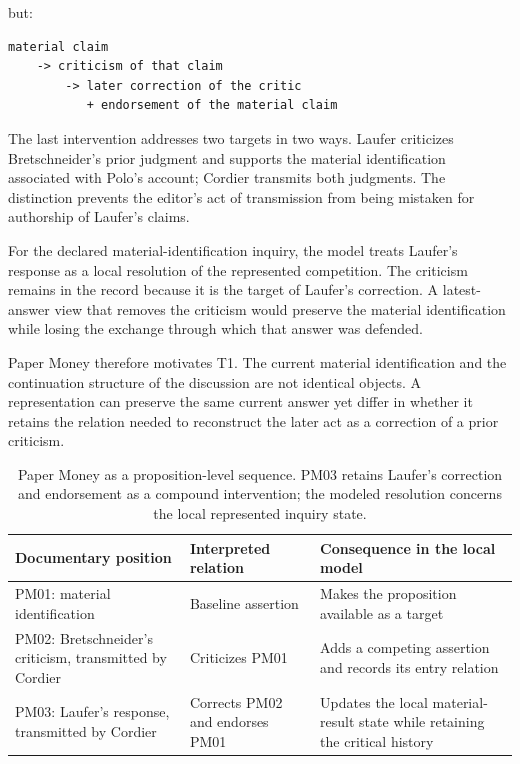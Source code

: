 \documentclass[11pt,a4paper]{article}
\begin{document}
but:


\begin{verbatim}
material claim
    -> criticism of that claim
        -> later correction of the critic
           + endorsement of the material claim
\end{verbatim}

The last intervention addresses two targets in two ways. Laufer criticizes Bretschneider's prior judgment and supports the material identification associated with Polo's account; Cordier transmits both judgments. The distinction prevents the editor's act of transmission from being mistaken for authorship of Laufer's claims.


For the declared material-identification inquiry, the model treats Laufer's response as a local resolution of the represented competition. The criticism remains in the record because it is the target of Laufer's correction. A latest-answer view that removes the criticism would preserve the material identification while losing the exchange through which that answer was defended.


Paper Money therefore motivates T1. The current material identification and the continuation structure of the discussion are not identical objects. A representation can preserve the same current answer yet differ in whether it retains the relation needed to reconstruct the later act as a correction of a prior criticism.


\begin{table}[H]
\centering
\footnotesize
\renewcommand{\arraystretch}{1.18}
\setlength{\tabcolsep}{3pt}
\begin{tabular}{>{\raggedright\arraybackslash}p{.23\linewidth}>{\raggedright\arraybackslash}p{.25\linewidth}>{\raggedright\arraybackslash}p{.43\linewidth}}
\toprule
Documentary position & Interpreted relation & Consequence in the local model \\
\midrule
PM01: material identification & Baseline assertion & Makes the proposition available as a target \\
PM02: Bretschneider's criticism, transmitted by Cordier & Criticizes PM01 & Adds a competing assertion and records its entry relation \\
PM03: Laufer's response, transmitted by Cordier & Corrects PM02 and endorses PM01 & Updates the local material-result state while retaining the critical history \\
\bottomrule
\end{tabular}
\caption{Paper Money as a proposition-level sequence. PM03 retains Laufer's correction and endorsement as a compound intervention; the modeled resolution concerns the local represented inquiry state.}
\label{tab:1}
\end{table}
\end{document}
